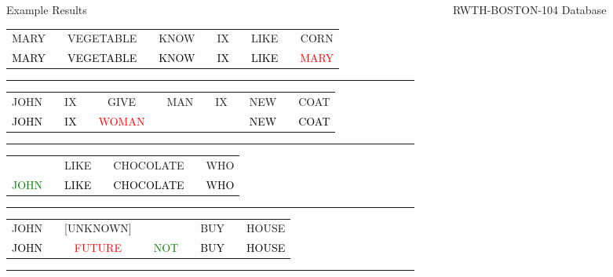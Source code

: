 \documentclass[final,t]{beamer}
\begin{document}
\begin{frame}{}
\begin{columns}[t]
\begin{column}{.3\linewidth}
\begin{columns}[t]
\begin{column}{.57\linewidth}
\begin{block}{Example Results}
\begin{tabular}{@{}>{\small}c@{}>{\small}c@{}>{\small}c@{}>{\small}c@{}>{\small}c@{}>{\small}c}
              MARY & \ \ VEGETABLE & \ \ KNOW & \ \ IX & \ \ LIKE & \ \ CORN\\
              \textcolor{black}{MARY} & \ \ \textcolor{black}{VEGETABLE} & \ \ \textcolor{black}{KNOW} & \ \ \textcolor{black}{IX} & \ \ \textcolor{black}{LIKE} & \ \ \textcolor{red}{MARY}
            \end{tabular}
            \hrule
            \begin{tabular}{@{}>{\small}c@{}>{\small}c@{}>{\small}c@{}>{\small}c@{}>{\small}c@{}>{\small}c@{}>{\small}c}
              JOHN & \ \ IX & \ \ GIVE & \ \ MAN & \ \ IX & \ \ NEW & \ \ COAT\\
              \textcolor{black}{JOHN} & \ \ \textcolor{black}{IX} & \ \ \textcolor{red}{WOMAN} & \ \ \textcolor{black}{\underline{\phantom{MAN}}} & \ \ \textcolor{black}{\underline{\phantom{IX}}} & \ \ \textcolor{black}{NEW} & \ \ \textcolor{black}{COAT}
            \end{tabular}
            \hrule
            \begin{tabular}{@{}>{\small}c@{}>{\small}c@{}>{\small}c@{}>{\small}c}
              & \ \ LIKE & \ \ CHOCOLATE & \ \ WHO\\
              \textcolor{green}{JOHN} & \ \ \textcolor{black}{LIKE} & \ \ \textcolor{black}{CHOCOLATE} & \ \ \textcolor{black}{WHO}
            \end{tabular}
            \hrule
            \begin{tabular}{@{}>{\small}c@{}>{\small}c@{}>{\small}c@{}>{\small}c@{}>{\small}c}
              JOHN & \ \ [UNKNOWN] & \ \  & \ \ BUY & \ \ HOUSE\\
              \textcolor{black}{JOHN} & \ \ \textcolor{red}{FUTURE} & \ \ \textcolor{green}{NOT} & \ \ \textcolor{black}{BUY} & \ \ \textcolor{black}{HOUSE}
            \end{tabular}
            \hrule
            \vspace{-1ex}            
          \end{block}
        \end{column}
        ~
        \begin{column}{.4\linewidth}
          \begin{block}{RWTH-BOSTON-104 Database}   
            \begin{table}
              \centering

\end{table}
\end{block}
\end{column}
\end{columns}
\end{column}
\end{columns}
\end{frame}
\end{document}
